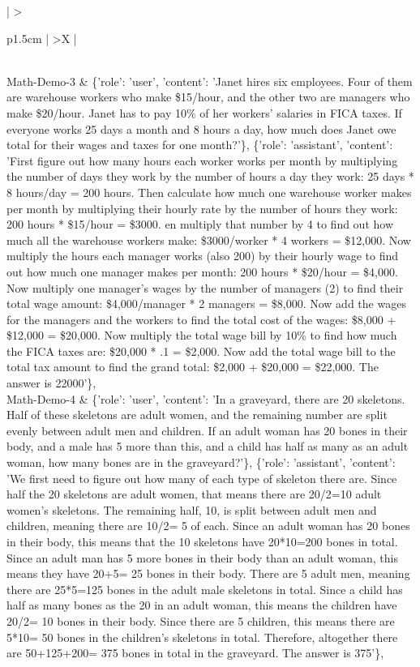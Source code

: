 \begin{xltabular}{\textwidth}{ 
    | >{\raggedright\arraybackslash}p{1.5cm} | %
    >{\RaggedRight\arraybackslash}X   |     %
}
    \\
\midrule
    Math-Demo-3 &  \{'role': 'user', 'content': 'Janet hires six employees. Four of them are warehouse workers who make \$15/hour, and the other two are managers who make \$20/hour. Janet has to pay 10\% of her workers' salaries in FICA taxes. If everyone works 25 days a month and 8 hours a day, how much does Janet owe total for their wages and taxes for one month?'\},
    \{'role': 'assistant', 'content': 'First figure out how many hours each worker works per month by multiplying the number of days they work by the number of hours a day they work: 25 days * 8 hours/day = 200 hours. Then calculate how much one warehouse worker makes per month by multiplying their hourly rate by the number of hours they work: 200 hours * \$15/hour = \$3000. en multiply that number by 4 to find out how much all the warehouse workers make: \$3000/worker * 4 workers = \$12,000. Now multiply the hours each manager works (also 200) by their hourly wage to find out how much one manager makes per month: 200 hours * \$20/hour = \$4,000. Now multiply one manager's wages by the number of managers (2) to find their total wage amount: \$4,000/manager * 2 managers = \$8,000. Now add the wages for the managers and the workers to find the total cost of the wages: \$8,000 + \$12,000 = \$20,000. Now multiply the total wage bill by 10\% to find how much the FICA taxes are: \$20,000 * .1 = \$2,000. Now add the total wage bill to the total tax amount to find the grand total: \$2,000 + \$20,000 = \$22,000. The answer is 22000'\},
    \\
\midrule
    Math-Demo-4 & \{'role': 'user', 'content': 'In a graveyard, there are 20 skeletons.  Half of these skeletons are adult women, and the remaining number are split evenly between adult men and children.  If an adult woman has 20 bones in their body, and a male has 5 more than this, and a child has half as many as an adult woman, how many bones are in the graveyard?'\},
    \{'role': 'assistant', 'content': 'We first need to figure out how many of each type of skeleton there are. Since half the 20 skeletons are adult women, that means there are 20/2=10 adult women's skeletons. The remaining half, 10, is split between adult men and children, meaning there are 10/2= 5 of each. Since an adult woman has 20 bones in their body, this means that the 10 skeletons have 20*10=200 bones in total. Since an adult man has 5 more bones in their body than an adult woman, this means they have 20+5= 25 bones in their body. There are 5 adult men, meaning there are 25*5=125 bones in the adult male skeletons in total. Since a child has half as many bones as the 20 in an adult woman, this means the children have 20/2= 10 bones in their body. Since there are 5 children, this means there are 5*10= 50 bones in the children's skeletons in total. Therefore, altogether there are 50+125+200= 375 bones in total in the graveyard. The answer is 375'\},

\end{xltabular}
